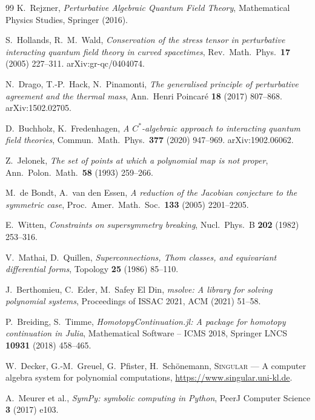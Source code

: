 \documentclass[11pt]{article}
\theoremstyle{definition}
\theoremstyle{remark}
\begin{document}
\begin{thebibliography}{99}
K.~Rejzner,
\emph{Perturbative Algebraic Quantum Field Theory},
Mathematical Physics Studies, Springer (2016).

S.~Hollands, R.~M.~Wald,
\emph{Conservation of the stress tensor in perturbative interacting
quantum field theory in curved spacetimes},
Rev.\ Math.\ Phys.\ \textbf{17} (2005) 227--311. arXiv:gr-qc/0404074.

N.~Drago, T.-P.~Hack, N.~Pinamonti,
\emph{The generalised principle of perturbative agreement and the
thermal mass},
Ann.\ Henri Poincar\'e \textbf{18} (2017) 807--868. arXiv:1502.02705.

D.~Buchholz, K.~Fredenhagen,
\emph{A $C^*$-algebraic approach to interacting quantum field theories},
Commun.\ Math.\ Phys.\ \textbf{377} (2020) 947--969.
arXiv:1902.06062.

Z.~Jelonek,
\emph{The set of points at which a polynomial map is not proper},
Ann.\ Polon.\ Math.\ \textbf{58} (1993) 259--266.

M.~de Bondt, A.~van den Essen,
\emph{A reduction of the Jacobian conjecture to the symmetric case},
Proc.\ Amer.\ Math.\ Soc.\ \textbf{133} (2005) 2201--2205.

E.~Witten,
\emph{Constraints on supersymmetry breaking},
Nucl.\ Phys.\ B \textbf{202} (1982) 253--316.

V.~Mathai, D.~Quillen,
\emph{Superconnections, Thom classes, and equivariant differential
forms},
Topology \textbf{25} (1986) 85--110.

J.~Berthomieu, C.~Eder, M.~Safey El Din,
\emph{msolve: A library for solving polynomial systems},
Proceedings of ISSAC 2021, ACM (2021) 51--58.

P.~Breiding, S.~Timme,
\emph{HomotopyContinuation.jl: A package for homotopy continuation in
Julia}, Mathematical Software -- ICMS 2018, Springer LNCS
\textbf{10931} (2018) 458--465.

W.~Decker, G.-M.~Greuel, G.~Pfister, H.~Sch\"onemann,
\textsc{Singular} --- {A} computer algebra system for polynomial
computations, \url{https://www.singular.uni-kl.de}.

A.~Meurer et al.,
\emph{SymPy: symbolic computing in Python},
PeerJ Computer Science \textbf{3} (2017) e103.

\end{thebibliography}
\end{document}
